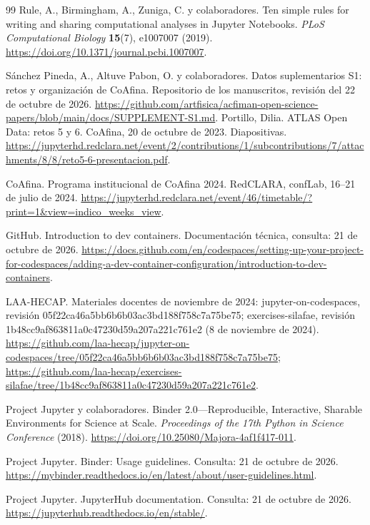 \begin{thebibliography}{99}
 Rule, A., Birmingham, A., Zuniga, C. y colaboradores. Ten simple rules for writing and sharing computational analyses in Jupyter Notebooks. \emph{PLoS Computational Biology} \textbf{15}(7), e1007007 (2019). \url{https://doi.org/10.1371/journal.pcbi.1007007}.

 Sánchez Pineda, A., Altuve Pabon, O. y colaboradores. Datos suplementarios S1: retos y organización de CoAfina. Repositorio de los manuscritos, revisión del 22 de octubre de 2026. \url{https://github.com/artfisica/acfiman-open-science-papers/blob/main/docs/SUPPLEMENT-S1.md}.
 Portillo, Dilia. ATLAS Open Data: retos 5 y 6. CoAfina, 20 de octubre de 2023. Diapositivas. \url{https://jupyterhd.redclara.net/event/2/contributions/1/subcontributions/7/attachments/8/8/reto5-6-presentacion.pdf}.

 CoAfina. Programa institucional de CoAfina 2024. RedCLARA, confLab, 16--21 de julio de 2024. \url{https://jupyterhd.redclara.net/event/46/timetable/?print=1&view=indico_weeks_view}.

 GitHub. Introduction to dev containers. Documentación técnica, consulta: 21 de octubre de 2026. \url{https://docs.github.com/en/codespaces/setting-up-your-project-for-codespaces/adding-a-dev-container-configuration/introduction-to-dev-containers}.

 LAA-HECAP. Materiales docentes de noviembre de 2024: jupyter-on-codespaces, revisión 05f22ca46a5bb6b6b03ac3bd188f758c7a75be75; exercises-silafae, revisión 1b48cc9af863811a0c47230d59a207a221c761e2 (8 de noviembre de 2024). \url{https://github.com/laa-hecap/jupyter-on-codespaces/tree/05f22ca46a5bb6b6b03ac3bd188f758c7a75be75}; \url{https://github.com/laa-hecap/exercises-silafae/tree/1b48cc9af863811a0c47230d59a207a221c761e2}.

 Project Jupyter y colaboradores. Binder 2.0---Reproducible, Interactive, Sharable Environments for Science at Scale. \emph{Proceedings of the 17th Python in Science Conference} (2018). \url{https://doi.org/10.25080/Majora-4af1f417-011}.

 Project Jupyter. Binder: Usage guidelines. Consulta: 21 de octubre de 2026. \url{https://mybinder.readthedocs.io/en/latest/about/user-guidelines.html}.

 Project Jupyter. JupyterHub documentation. Consulta: 21 de octubre de 2026. \url{https://jupyterhub.readthedocs.io/en/stable/}.


\end{thebibliography}
